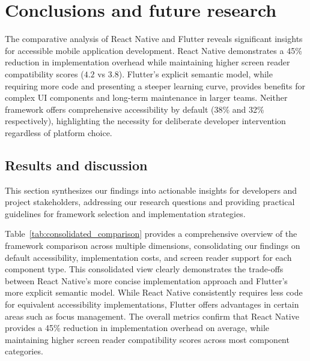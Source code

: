 \chapter{Conclusions and future research}
\label{chap:conclusions}

The comparative analysis of React Native and Flutter reveals significant insights for accessible mobile application development. React Native demonstrates a 45\% reduction in implementation overhead while maintaining higher screen reader compatibility scores ($4.2$ vs $3.8$). Flutter's explicit semantic model, while requiring more code and presenting a steeper learning curve, provides benefits for complex UI components and long-term maintenance in larger teams. Neither framework offers comprehensive accessibility by default (38\% and 32\% respectively), highlighting the necessity for deliberate developer intervention regardless of platform choice.\\

\section{Results and discussion}
\label{sec:results-discussion}

This section synthesizes our findings into actionable insights for developers and project stakeholders, addressing our research questions and providing practical guidelines for framework selection and implementation strategies.

Table~\ref{tab:consolidated_comparison} provides a comprehensive overview of the framework comparison across multiple dimensions, consolidating our findings on default accessibility, implementation costs, and screen reader support for each component type. This consolidated view clearly demonstrates the trade-offs between React Native's more concise implementation approach and Flutter's more explicit semantic model. While React Native consistently requires less code for equivalent accessibility implementations, Flutter offers advantages in certain areas such as focus management. The overall metrics confirm that React Native provides a 45\% reduction in implementation overhead on average, while maintaining higher screen reader compatibility scores across most component categories.

